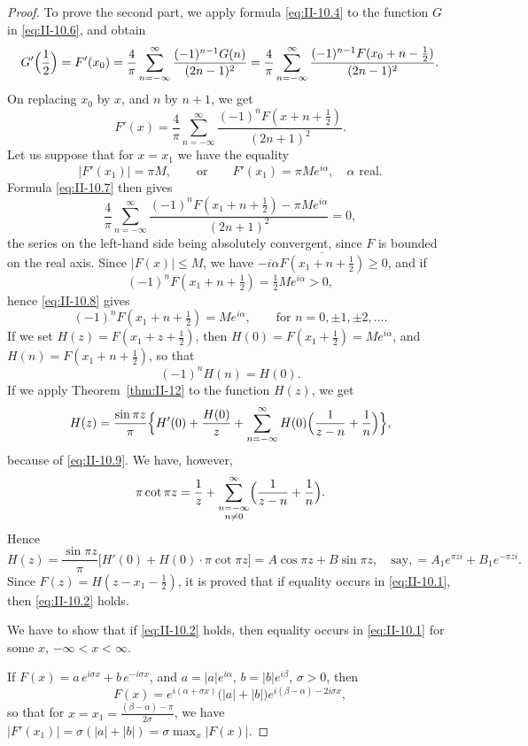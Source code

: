 \begin{proof}
To prove the second part, we apply formula \eqref{eq:II-10.4} to the function $G$ in \eqref{eq:II-10.6}, and obtain
\[
G'\Bigl(\frac{1}{2}\Bigr)=F'(x_{0})
=\frac{4}{\pi}\sum_{n=-\infty}^{\infty}\frac{(-1)^{n-1}G(n)}{(2n-1)^{2}}
=\frac{4}{\pi}\sum_{n=-\infty}^{\infty}\frac{(-1)^{n-1}F(x_{0}+n-\frac{1}{2})}{(2n-1)^{2}}.
\]
On replacing $x_{0}$ by $x$, and $n$ by $n+1$, we get
\begin{equation}\tag{10.7}\label{eq:II-10.7}
F'(x)=\frac{4}{\pi}\sum_{n=-\infty}^{\infty}\frac{(-1)^{n}F(x+n+\frac{1}{2})}{(2n+1)^{2}}.
\end{equation}
Let us suppose that for $x=x_{1}$ we have the equality
\[
|F'(x_{1})|=\pi M,\qquad\text{or}\qquad F'(x_{1})=\pi M e^{i\alpha},\quad\alpha\text{ real}.
\]
Formula \eqref{eq:II-10.7} then gives
\begin{equation}\tag{10.8}\label{eq:II-10.8}
\frac{4}{\pi}\sum_{n=-\infty}^{\infty}\frac{(-1)^{n}F(x_{1}+n+\frac{1}{2})-\pi M e^{i\alpha}}{(2n+1)^{2}}=0,
\end{equation}
the series on the left-hand side being absolutely convergent, since $F$ is bounded on the real axis. Since $|F(x)|\le M$, we have $-i\alpha\overline{F(x_{1}+n+\frac{1}{2})}\ge 0$, and if
\[
(-1)^{n}F(x_{1}+n+\tfrac{1}{2})=\tfrac{1}{2}M e^{i\alpha}>0,
\]
hence \eqref{eq:II-10.8} gives
\[
(-1)^{n}F(x_{1}+n+\tfrac{1}{2})=M e^{i\alpha},\qquad\text{for }n=0,\pm1,\pm2,\dots.
\]
If we set $H(z)=F(x_{1}+z+\frac{1}{2})$, then $H(0)=F(x_{1}+\frac{1}{2})=M e^{i\alpha}$, and $H(n)=F(x_{1}+n+\frac{1}{2})$, so that
\begin{equation}\tag{10.9}\label{eq:II-10.9}
(-1)^{n}H(n)=H(0).
\end{equation}
If we apply Theorem~\ref{thm:II-12} to the function $H(z)$, we get
\[
H(z)=\frac{\sin\pi z}{\pi}\Bigl\{H'(0)+\frac{H(0)}{z}
+\sum_{n=-\infty}^{\infty}H(0)\Bigl(\frac{1}{z-n}+\frac{1}{n}\Bigr)\Bigr\},
\]
because of \eqref{eq:II-10.9}. We have, however,
\[
\pi\cot\pi z=\frac{1}{z}+\sum_{\substack{n=-\infty\\ n\neq 0}}^{\infty}\Bigl(\frac{1}{z-n}+\frac{1}{n}\Bigr).
\]
Hence
\[
H(z)=\frac{\sin\pi z}{\pi}\bigl[H'(0)+H(0)\cdot\pi\cot\pi z\bigr]
=A\cos\pi z+B\sin\pi z,\quad\text{say},
=A_{1}e^{\pi z i}+B_{1}e^{-\pi z i}.
\]
Since $F(z)=H(z-x_{1}-\frac{1}{2})$, it is proved that if equality occurs in \eqref{eq:II-10.1}, then \eqref{eq:II-10.2} holds.

We have to show that if \eqref{eq:II-10.2} holds, then equality occurs in \eqref{eq:II-10.1} for some $x$, $-\infty<x<\infty$.

If $F(x)=a\,e^{i\sigma x}+b\,e^{-i\sigma x}$, and $a=|a|e^{i\alpha}$, $b=|b|e^{i\beta}$, $\sigma>0$, then
\[
F(x)=e^{i(\alpha+\sigma x)}\bigl(|a|+|b|\bigr)e^{i(\beta-\alpha)-2i\sigma x},
\]
so that for $x=x_{1}=\frac{(\beta-\alpha)-\pi}{2\sigma}$, we have $|F'(x_{1})|=\sigma(|a|+|b|)=\sigma\max_{x}|F(x)|$.
\end{proof}

